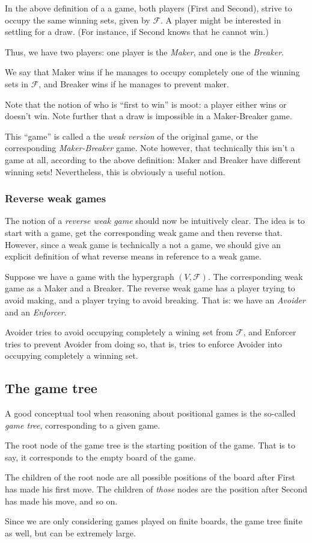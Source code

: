 In the above definition of a a game, both players (First and Second), strive to occupy the same winning sets, given by $\mathcal F$. A player might be interested in settling for a draw. (For instance, if Second knows that he cannot win.) 

Thus, we have two players: one player is the \emph{Maker}, and one is the \emph{Breaker}.

We say that Maker wins if he manages to occupy completely one of the winning sets in $\mathcal F$, and Breaker wins if he manages to prevent maker.

Note that the notion of who is ``first to win'' is moot: a player either wins or doesn't win.
Note further that a draw is impossible in a Maker-Breaker game.

This ``game'' is called a the \emph{weak version} of the original game, or the corresponding \emph{Maker-Breaker} game.
Note however, that technically this isn't a game at all, according to the above definition: Maker and Breaker have different winning sets! Nevertheless, this is obviously a useful notion.

\subsubsection{Reverse weak games}

The notion of a \emph{reverse weak game} should now be intuitively clear.
The idea is to start with a game, get the corresponding weak game and then reverse that.
However, since a weak game is technically a not a game, we should give an explicit definition of what reverse means in reference to a weak game.

Suppose we have a game with the hypergraph $(V,\mathcal F)$.
The corresponding weak game as a Maker and a Breaker.
The reverse weak game has a player trying to avoid making, and a player trying to avoid breaking.
That is: we have an \emph{Avoider} and an \emph{Enforcer}.

Avoider tries to avoid occupying completely a wining set from $\mathcal F$, and Enforcer tries to prevent Avoider from doing so, that is, tries to enforce Avoider into occupying completely a winning set.


\subsection{The game tree}
\label{subsec:gametree}
A good conceptual tool when reasoning about positional games is the so-called \emph{game tree}, corresponding to a given game.

The root node of the game tree is the starting position of the game.
That is to say, it corresponds to the empty board of the game.

The children of the root node are all possible positions of the board after First has made his first move.
The children of \emph{those} nodes are the position after Second has made his move, and so on.

Since we are only considering games played on finite boards, the game tree finite as well, but can be extremely large.
